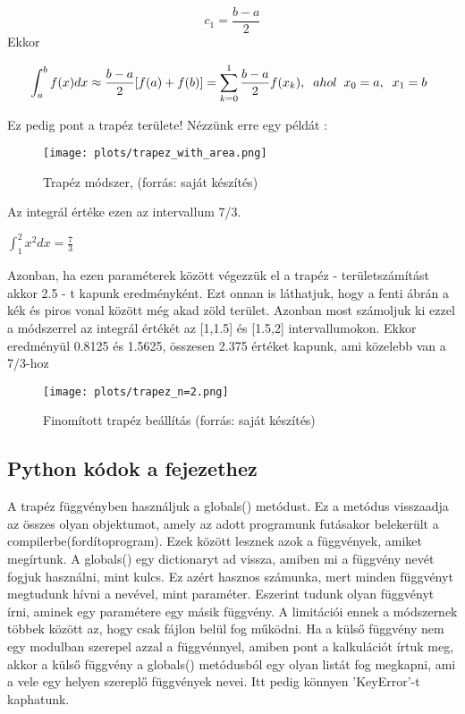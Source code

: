 \documentclass{article}
\theoremstyle{definition}
\theoremstyle{theorem}
\begin{document}
\begin{equation*}
c_1 = \frac{b-a}{2}
\end{equation*}
Ekkor

\begin{equation*}
    \int_a^b f(x) dx \approx \frac{b-a}{2}[f(a) + f(b)] = \sum_{k=0}^{1} \frac{b-a}{2} f(x_k),\\
    \;\;ahol \;\;x_0 = a,\;\;x_1=b
    \;\;
\end{equation*}

Ez pedig pont a trapéz területe! Nézzünk erre egy példát :
\newline
\begin{figure}[!h]
    \centering
    \texttt{[image: plots/trapez\_with\_area.png]}
    \caption{Trapéz módszer, (forrás: saját készítés)}
    \label{trapez_pelda}
\end{figure}


Az integrál értéke ezen az intervallum 7/3.
\begin{center}
$\int_{1}^{2} x ^2 dx = \frac{7}{3}$
\end{center}
Azonban, ha ezen paraméterek között végezzük el a trapéz - területszámítást akkor 2.5 - t kapunk eredményként. Ezt onnan is láthatjuk, hogy a fenti ábrán a kék és piros vonal között még akad zöld terület. Azonban most számoljuk ki ezzel a módszerrel az integrál értékét az [1,1.5] és [1.5,2] intervallumokon. Ekkor eredményül 0.8125 és 1.5625, összesen 2.375 értéket kapunk, ami közelebb van a 7/3-hoz

\begin{figure}[h]
    \centering
    \texttt{[image: plots/trapez\_n=2.png]}
    \caption{Finomított trapéz beállítás (forrás: saját készítés)}
    \label{n=2_trapez_pelda}
\end{figure}
\pagebreak

\subsection{Python kódok a fejezethez}
A trapéz függvényben használjuk a globals() metódust. Ez a metódus visszaadja az összes olyan objektumot, amely az adott programunk futásakor belekerült a compilerbe(fordítoprogram). Ezek között lesznek azok a függvények, amiket megírtunk. A globals() egy dictionaryt ad vissza, amiben mi a függvény nevét fogjuk használni, mint kulcs. Ez azért hasznos számunka, mert minden függvényt megtudunk hívni a nevével, mint paraméter. Eszerint tudunk olyan függvényt írni, aminek egy paramétere egy másik függvény. A limitációi ennek a módszernek többek között az, hogy csak fájlon belül fog működni. Ha a külső függvény nem egy modulban szerepel azzal a függvénnyel, amiben pont a kalkulációt írtuk meg, akkor a külső függvény a globals() metódusból egy olyan listát fog megkapni, ami a vele egy helyen szereplő függvények nevei. Itt pedig könnyen 'KeyError'-t kaphatunk.
\pagebreak

\pagebreak
\end{document}
